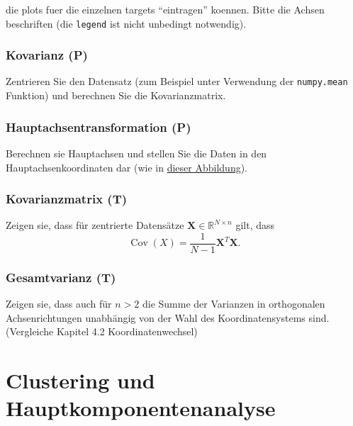 \documentclass[]{book}
\theoremstyle{definition}
\theoremstyle{definition}
\theoremstyle{definition}
\theoremstyle{definition}
\theoremstyle{remark}
\begin{document}
die plots fuer die einzelnen targets ``eintragen'' koennen. Bitte die Achsen beschriften (die \texttt{legend} ist nicht unbedingt notwendig).

\hypertarget{kovarianz-p}{%
\subsection{Kovarianz (P)}\label{kovarianz-p}}

Zentrieren Sie den Datensatz (zum Beispiel unter Verwendung der \texttt{numpy.mean} Funktion) und berechnen Sie die Kovarianzmatrix.

\hypertarget{hauptachsentransformation-p}{%
\subsection{Hauptachsentransformation (P)}\label{hauptachsentransformation-p}}

Berechnen sie Hauptachsen und stellen Sie die Daten in den Hauptachsenkoordinaten dar (wie in \protect\hyperlink{fig:05-penguin-allpairs-pcs}{dieser Abbildung}).

\hypertarget{kovarianzmatrix-t}{%
\subsection{Kovarianzmatrix (T)}\label{kovarianzmatrix-t}}

Zeigen sie, dass für zentrierte Datensätze \({\mathbf{X}}\in \mathbb R^{N\times n}\) gilt, dass
\begin{equation*}
\operatorname{Cov}(X) = \frac{1}{N-1}{\mathbf{X}}^T{\mathbf{X}}.
\end{equation*}

\hypertarget{gesamtvarianz-t}{%
\subsection{Gesamtvarianz (T)}\label{gesamtvarianz-t}}

Zeigen sie, dass auch für \(n>2\) die Summe der Varianzen in orthogonalen Achsenrichtungen unabhängig von der Wahl des Koordinatensystems sind. (Vergleiche Kapitel 4.2 Koordinatenwechsel)

\hypertarget{clustering-und-hauptkomponentenanalyse}{%
\chapter{Clustering und Hauptkomponentenanalyse}\label{clustering-und-hauptkomponentenanalyse}}
\end{document}

